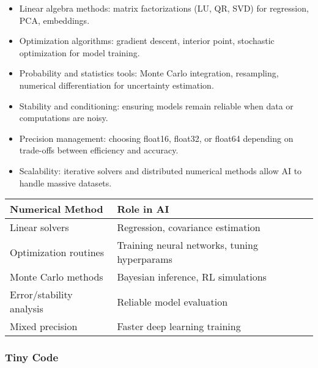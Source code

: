 \documentclass[
  letterpaper,
  DIV=11,
  numbers=noendperiod]{scrreprt}
\providecommand{\tightlist}{%
  \setlength{\itemsep}{0pt}\setlength{\parskip}{0pt}}
\begin{document}
\begin{itemize}
\tightlist
\item
  Linear algebra methods: matrix factorizations (LU, QR, SVD) for
  regression, PCA, embeddings.
\item
  Optimization algorithms: gradient descent, interior point, stochastic
  optimization for model training.
\item
  Probability and statistics tools: Monte Carlo integration, resampling,
  numerical differentiation for uncertainty estimation.
\item
  Stability and conditioning: ensuring models remain reliable when data
  or computations are noisy.
\item
  Precision management: choosing float16, float32, or float64 depending
  on trade-offs between efficiency and accuracy.
\item
  Scalability: iterative solvers and distributed numerical methods allow
  AI to handle massive datasets.
\end{itemize}

\begin{longtable}[]{@{}
  >{\raggedright\arraybackslash}p{}
  >{\raggedright\arraybackslash}p{}@{}}
\toprule\noalign{}
\begin{minipage}[b]{\linewidth}\raggedright
Numerical Method
\end{minipage} & \begin{minipage}[b]{\linewidth}\raggedright
Role in AI
\end{minipage} \\
\midrule\noalign{}
\endhead
\bottomrule\noalign{}
\endlastfoot
Linear solvers & Regression, covariance estimation \\
Optimization routines & Training neural networks, tuning hyperparams \\
Monte Carlo methods & Bayesian inference, RL simulations \\
Error/stability analysis & Reliable model evaluation \\
Mixed precision & Faster deep learning training \\
\end{longtable}

\subsubsection{Tiny Code}\label{tiny-code-159}
\end{document}

